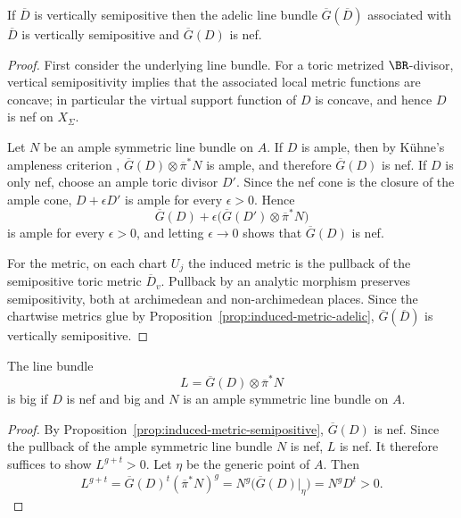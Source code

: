 \documentclass[10pt,a4paper]{amsart}
\theoremstyle{plain}
\theoremstyle{plain}
\numberwithin{equation}{section}
\providecommand{\bD}{\overline{D}}
\begin{document}
\begin{prop}\label{prop:induced-metric-semipositive}
	If \(\overline{D}\) is vertically semipositive then the adelic line bundle
	\(\overline{G}(\overline{D})\) associated with \(\overline{D}\) is vertically
	semipositive and \(\overline{G}(D)\) is nef.
\end{prop}  
\begin{proof}
	First consider the underlying line bundle.  For a toric metrized
	\(\BR\)-divisor, vertical semipositivity implies that the associated local
	metric functions are concave; in particular the virtual support function of
	\(D\) is concave, and hence \(D\) is nef on \(X_\Sigma\).
	
	Let \(N\) be an ample symmetric line bundle on \(A\).  If \(D\) is ample, then
	by K\"uhne's ampleness criterion \cite[Lemma 3, Chapter 2]{Ku1},
	\(\overline G(D)\otimes\overline\pi^*N\) is ample, and therefore
	\(\overline G(D)\) is nef.  If \(D\) is only nef, choose an ample toric divisor
	\(D'\).  Since the nef cone is the closure of the ample cone,
	\(D+\epsilon D'\) is ample for every \(\epsilon>0\).  Hence
	\[
	\overline G(D)+\epsilon\bigl(\overline G(D')\otimes\overline\pi^*N\bigr)
	\]
	is ample for every \(\epsilon>0\), and letting \(\epsilon\to0\) shows that
	\(\overline G(D)\) is nef.
	
	For the metric, on each chart \(U_j\) the induced metric is the pullback of
	the semipositive toric metric \(\bD_v\).  Pullback by an analytic morphism
	preserves semipositivity, both at archimedean and non-archimedean places.
	Since the chartwise metrics glue by Proposition~\ref{prop:induced-metric-adelic},
	\(\overline G(\bD)\) is vertically semipositive.
\end{proof}
\begin{cor}
	The line bundle
	\[
	L=\overline{G}(D)\otimes \overline{\pi}^{*}N
	\]
	is big if \(D\) is nef and big and \(N\) is an ample symmetric line bundle on
	\(A\).
\end{cor}
\begin{proof}
	By Proposition~\ref{prop:induced-metric-semipositive}, \(\overline{G}(D)\) is nef.
	Since the pullback of the ample symmetric line bundle \(N\) is nef, \(L\)
	is nef.  It therefore suffices to show \(L^{g+t}>0\).
	Let \(\eta\) be the generic point of \(A\).  Then
	\[
	L^{g+t}
	=
	\overline{G}(D)^t(\overline{\pi}^*N)^g
	=
	N^g\bigl(\overline{G}(D)|_{\eta}\bigr)
	=
	N^gD^t>0.
	\]
\end{proof}
\end{document}
